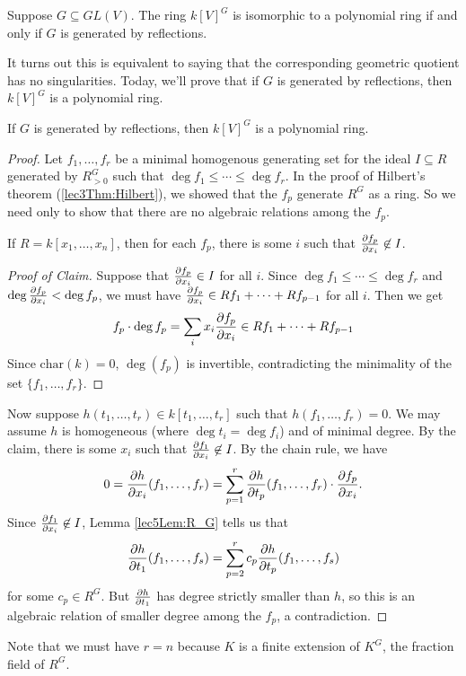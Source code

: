 \begin{theorem}
 Suppose $G\subseteq GL(V)$. The ring $k[V]^G$ is isomorphic to a polynomial ring if and only if $G$ is generated by reflections.
\end{theorem}
It turns out this is equivalent to saying that the corresponding geometric quotient has no singularities. Today, we'll prove that if $G$ is generated by reflections, then $k[V]^G$ is a polynomial ring.
\begin{proposition}\label{lec5:one_dir_CST}
 If $G$ is generated by reflections, then $k[V]^G$ is a polynomial ring.
\end{proposition}
\begin{proof}
 Let $f_1,\dots, f_r$ be a minimal homogenous generating set for the ideal $I\subseteq R$ generated by $R^G_{>0}$ such that $\deg f_1\leq\cdots \leq \deg f_r$. In the proof of Hilbert's theorem (\ref{lec3Thm:Hilbert}), we showed that the $f_p$ generate $R^G$ as a ring. So we need only to show that there are no algebraic relations among the $f_p$.
 \begin{claim}
  If $R=k[x_1,\dots, x_n]$, then for each $f_p$, there is some $i$ such that $\frac{\partial f_p}{\partial x_i}\not\in I$.
 \end{claim}
 \begin{proof}[Proof of Claim]
  Suppose that $\frac{\partial f_p}{\partial x_i}\in I$ for all $i$. Since $\deg f_1\le \cdots \le \deg f_r$ and $\deg \frac{\partial f_p}{\partial x_i}<\deg f_p$, we must have $\frac{\partial f_p}{\partial x_i}\in R f_1+\cdots + Rf_{p-1}$ for all $i$. Then we get
  \[
   f_p \cdot \deg f_p = \sum_i x_i \frac{\partial f_p}{\partial x_i}\in R f_1+\cdots + Rf_{p-1}   
  \]
  Since $\mathrm{char}(k)=0$, $\deg(f_p)$ is invertible, contradicting the minimality of the set $\{f_1,\dots, f_r\}$.
  \renewcommand{\qedsymbol}{\fbox{\scriptsize Claim}}
 \end{proof}
 Now suppose $h(t_1,\dots, t_r)\in k[t_1,\dots, t_r]$ such that $h(f_1,\dots, f_r)=0$. We may assume $h$ is homogeneous (where $\deg t_i=\deg f_i$) and of minimal degree. By the claim, there is some $x_i$ such that $\frac{\partial f_1}{\partial x_i}\not\in I$. By the chain rule, we have
 \[
  0 = \frac{\partial h}{\partial x_i}(f_1,\dots, f_r) = \sum_{p=1}^r \frac{\partial h}{\partial t_p}(f_1,\dots, f_r)\cdot \frac{\partial f_p}{\partial x_i}.
 \]
 Since $\frac{\partial f_1}{\partial x_i}\not\in I$, Lemma \ref{lec5Lem:R_G} tells us that
 \[
  \frac{\partial h}{\partial t_1}(f_1,\dots, f_s) = \sum_{p=2}^r c_p \frac{\partial h}{\partial t_p}(f_1,\dots, f_s)
 \]
 for some $c_p\in R^G$. But $\frac{\partial h}{\partial t_1}$ has degree strictly smaller than $h$, so this is an algebraic relation of smaller degree among the $f_p$, a contradiction.
\end{proof}

\begin{remark}
 Note that we must have $r=n$ because $K$ is a finite extension of $K^G$, the fraction field of $R^G$.
\end{remark}